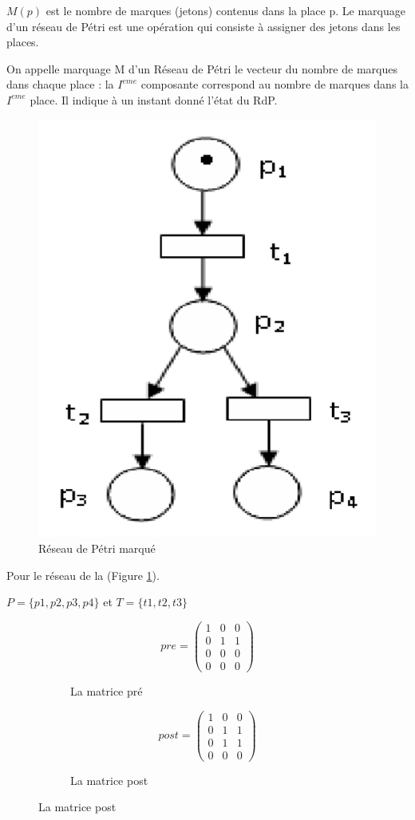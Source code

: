 $ M(p) $ est le nombre de marques (jetons) contenus dans la place p. Le marquage d’un réseau de Pétri est une opération qui consiste à assigner des jetons dans les places.

On appelle marquage M d’un Réseau de Pétri le vecteur du nombre de marques dans chaque place : la $ I^{eme} $ composante  correspond au nombre de marques dans la $ I^{eme} $   place. Il indique à un instant donné l'état du RdP.\parencite{Rdp}   


\begin{exmp}
	
	
	\begin{figure}[H]
		\centering
		\includegraphics[width=0.4\linewidth]{images/pitref02PNG}
		\caption{ Réseau de Pétri marqué }
		\label{fig:pitref02png}
	\end{figure}
	
	Pour le réseau de la (Figure \ref{fig:pitref02png}). 
	
	$ P= \{p1, p2, p3, p4\}$ et $T= \{t1, t2, t3\}  $
	
	
	\begin{figure}[H]
		\centering
		
		\begin{subfigure}[b]{0.4\textwidth}
			\[
			pre=
			\begin{pmatrix}
			1 & 0 & 0 \\
			0 & 1 & 1 \\
			0 & 0 & 0 \\
			0 & 0 & 0
			\end{pmatrix}
			\]
			\caption{La matrice pré}
		\end{subfigure}
		\hfill
		\begin{subfigure}[b]{0.4\textwidth}
			\[	post=
			\begin{pmatrix}
			1 & 0 & 0 \\
			0 & 1 & 1 \\
			0 & 1 & 1 \\
			0 & 0 & 0 
			\end{pmatrix}
			\]
			\caption{La matrice post}
		\end{subfigure}
		

\end{figure}
\end{exmp}
